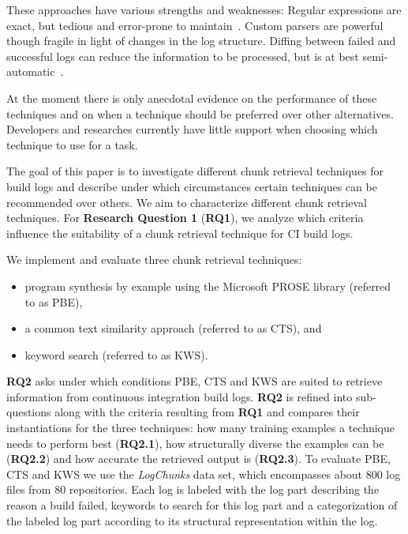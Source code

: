 These approaches have various strengths and weaknesses: Regular
expressions are exact, but tedious and error-prone to
maintain~\cite{michael2019regexes}.  Custom parsers are powerful
though fragile in light of changes in the log structure. Diffing
between failed and successful logs can reduce the information to be
processed, but is at best semi-automatic~\cite{amar2019mining}.

At the moment there is only anecdotal evidence on the performance of these techniques and on when a technique should be preferred over other alternatives.
Developers and researches currently have little support when choosing which technique to use for a task.

The goal of this paper is to investigate different chunk retrieval techniques for build logs and describe under which circumstances certain techniques can be recommended over others.
We aim to characterize different chunk retrieval techniques.
For \textbf{Research Question 1} (\textbf{RQ1}), we analyze which criteria influence the suitability of a chunk retrieval technique for CI build logs.

We implement and evaluate three chunk retrieval techniques:
\begin{itemize}
  \item program synthesis by example using the Microsoft PROSE library (referred to as PBE),
  \item a common text similarity approach (referred to as CTS), and
  \item keyword search (referred to as KWS).
\end{itemize}
\textbf{RQ2} asks under which conditions PBE, CTS and KWS are suited to retrieve information from continuous integration build logs.
\textbf{RQ2} is refined into sub-questions along with the criteria resulting from \textbf{RQ1} and compares their instantiations for the three techniques:
how many training examples a technique needs to perform best (\textbf{RQ2.1}), how structurally diverse the examples can be (\textbf{RQ2.2}) and how accurate the retrieved output is (\textbf{RQ2.3}).
To evaluate PBE, CTS and KWS we use the \emph{LogChunks} data set, which encompasses about 800 log files from 80 repositories.
Each log is labeled with the log part describing the reason a build failed, keywords to search for this log part and a categorization of the labeled log part according to its structural representation within the log.

